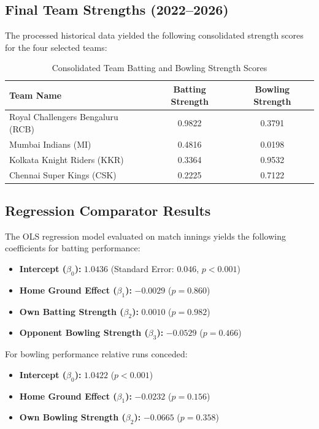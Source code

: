 \documentclass[11pt, a4paper]{article}
\begin{document}
\subsection{Final Team Strengths (2022--2026)}
The processed historical data yielded the following consolidated strength scores for the four selected teams:

\begin{table}[h]
\centering
\begin{tabular}{lcc}
\toprule
\textbf{Team Name} & \textbf{Batting Strength} & \textbf{Bowling Strength} \\
\midrule
Royal Challengers Bengaluru (RCB) & 0.9822 & 0.3791 \\
Mumbai Indians (MI) & 0.4816 & 0.0198 \\
Kolkata Knight Riders (KKR) & 0.3364 & 0.9532 \\
Chennai Super Kings (CSK) & 0.2225 & 0.7122 \\
\bottomrule
\end{tabular}
\caption{Consolidated Team Batting and Bowling Strength Scores}
\label{tab:team_strengths}
\end{table}

\subsection{Regression Comparator Results}
The OLS regression model evaluated on match innings yields the following coefficients for batting performance:
\begin{itemize}[label=-]
    \item \textbf{Intercept ($\beta_0$):} $1.0436$ (Standard Error: $0.046$, $p < 0.001$)
    \item \textbf{Home Ground Effect ($\beta_1$):} $-0.0029$ ($p = 0.860$)
    \item \textbf{Own Batting Strength ($\beta_2$):} $0.0010$ ($p = 0.982$)
    \item \textbf{Opponent Bowling Strength ($\beta_3$):} $-0.0529$ ($p = 0.466$)
\end{itemize}

For bowling performance relative runs conceded:
\begin{itemize}[label=-]
    \item \textbf{Intercept ($\beta_0$):} $1.0422$ ($p < 0.001$)
    \item \textbf{Home Ground Effect ($\beta_1$):} $-0.0232$ ($p = 0.156$)
    \item \textbf{Own Bowling Strength ($\beta_2$):} $-0.0665$ ($p = 0.358$)
\end{itemize}
\end{document}
